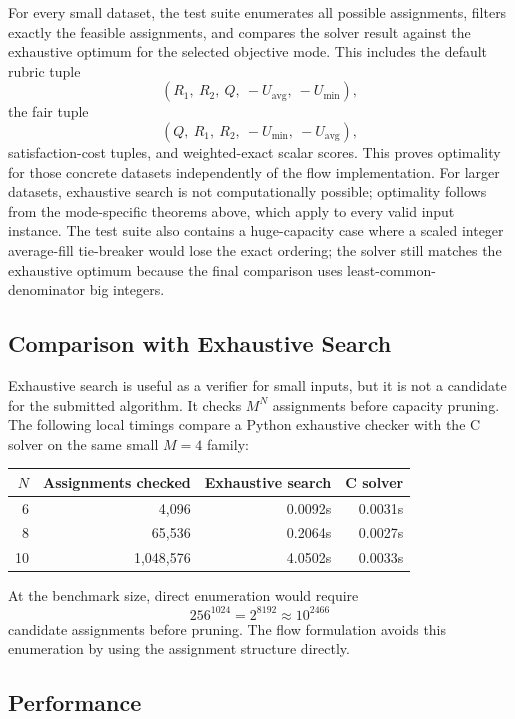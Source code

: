 \documentclass[11pt,a4paper]{article}
\begin{document}
For every small dataset, the test suite enumerates all possible assignments,
filters exactly the feasible assignments, and compares the solver result
against the exhaustive optimum for the selected objective mode.  This includes
the default rubric tuple
\[
  (R_1,\ R_2,\ Q,\ -U_{\mathrm{avg}},\ -U_{\min}),
\]
the fair tuple
\[
  (Q,\ R_1,\ R_2,\ -U_{\min},\ -U_{\mathrm{avg}}),
\]
satisfaction-cost tuples, and weighted-exact scalar scores.  This proves
optimality for those concrete datasets independently of the flow
implementation.  For larger datasets, exhaustive search is not computationally
possible; optimality follows from the mode-specific theorems above, which
apply to every valid input instance.  The test suite also contains a
huge-capacity case where a scaled integer average-fill tie-breaker would lose
the exact ordering; the solver still matches the exhaustive optimum because
the final comparison uses least-common-denominator big integers.

\subsection{Comparison with Exhaustive Search}

Exhaustive search is useful as a verifier for small inputs, but it is not a
candidate for the submitted algorithm.  It checks \(M^N\) assignments before
capacity pruning.  The following local timings compare a Python exhaustive
checker with the C solver on the same small \(M=4\) family:

\begin{center}
\begin{tabular}{rrrr}
\toprule
\(N\) & Assignments checked & Exhaustive search & C solver \\
\midrule
6  & 4,096     & 0.0092s & 0.0031s \\
8  & 65,536    & 0.2064s & 0.0027s \\
10 & 1,048,576 & 4.0502s & 0.0033s \\
\bottomrule
\end{tabular}
\end{center}

At the benchmark size, direct enumeration would require
\[
  256^{1024}=2^{8192}\approx 10^{2466}
\]
candidate assignments before pruning.  The flow formulation avoids this
enumeration by using the assignment structure directly.

\subsection{Performance}
\end{document}
